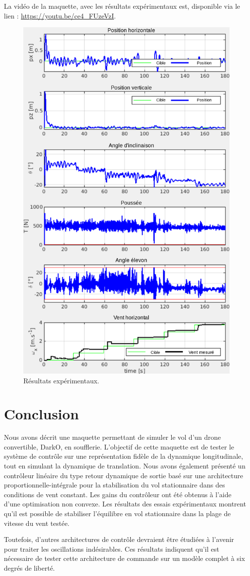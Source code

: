 La vidéo de la maquette, avec les résultats expérimentaux est, disponible via le lien : \url{https://youtu.be/ce4_FUzeVzI}.

\begin{figure}[!ht]
   \centering
    \includegraphics[width=0.7\columnwidth]{figures/exp.png}
    \caption{Résultats expérimentaux.}
    \label{fig_exp_centrage_arr}
\end{figure}

\section{Conclusion}
Nous avons décrit une maquette permettant de simuler le vol d'un drone convertible, DarkO, en soufflerie. L'objectif de cette maquette est de tester le système de contrôle sur une représentation fidèle de la dynamique longitudinale, tout en simulant la dynamique de translation. Nous avons également présenté un contrôleur linéaire du type retour dynamique de sortie basé sur une architecture proportionnelle-intégrale pour la stabilisation du vol stationnaire dans des conditions de vent constant. Les gains du contrôleur ont été obtenus à l'aide d'une optimisation non convexe. Les résultats des essais expérimentaux montrent qu'il est possible de stabiliser l'équilibre en vol stationnaire dans la plage de vitesse du vent testée. 

Toutefois, d'autres architectures de contrôle devraient être étudiées à l'avenir pour traiter les oscillations indésirables. Ces résultats indiquent qu'il est nécessaire de tester cette architecture de commande sur un modèle complet à six degrés de liberté.
